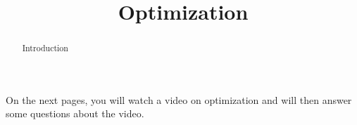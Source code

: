\documentclass[handout]{ximera}
\title{Optimization}
\begin{document}
\begin{abstract} Introduction %
\end{abstract}

\maketitle

On the next pages, you will watch a video on optimization and will then answer some questions about the video.
\end{document}
